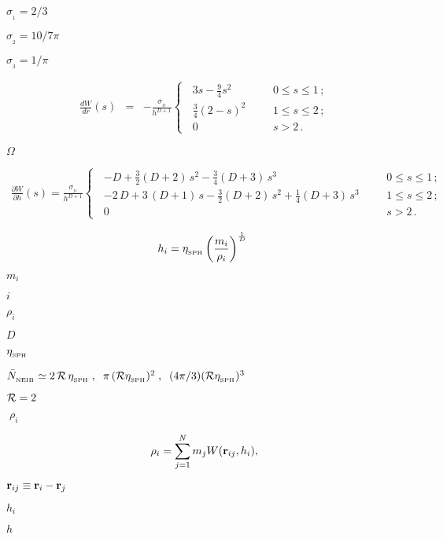 \documentclass{article}
\begin{document}
$\sigma_{_1}=2/3$
\pagebreak

$\sigma_{_2}=10/7\pi$
\pagebreak

$\sigma_{_3}=1/\pi$
\pagebreak

\begin{eqnarray} \frac{dW}{dr}(s) &=& - \frac{\sigma_{\!_D}}{h^{D+1}} \left\{ \;\; \begin{array}{ll} 3s - \frac{9}{4}s^2 \;\;\;\; & \;\;0 \leq s \leq 1\,; \\ \frac{3}{4}(2-s)^2 \;\;\;\; & \;\;1 \leq s \leq 2\,; \\ 0 \;\;\;\; & \;\;s > 2 \,. \end{array} \right . \end{eqnarray}
\pagebreak

$\Omega$
\pagebreak

\begin{eqnarray} \frac{\partial W}{\partial h}(s) = \frac{\sigma_{\!_D}}{h^{D+1}} \left\{ \;\; \begin{array}{ll} -D + \frac{3}{2}(D + 2)\,s^2 - \frac{3}{4}(D + 3)\,s^3 \;\;\;\; & \;\;0 \leq s \leq 1\,; \\ -2\,D + 3\,(D + 1)\,s - \frac{3}{2}(D + 2)\,s^2 + \frac{1}{4}(D + 3)\,s^3 \;\;\;\; & \;\;1 \leq s \leq 2\,; \\ 0 \;\;\;\; & \;\;s > 2 \,. \end{array} \right . \end{eqnarray}
\pagebreak

\[ h_i = \eta_{_{\rm SPH}} \left( \frac{m_i }{\rho_i} \right)^{\frac{1}{D}}\ \]
\pagebreak

$m_i$
\pagebreak

$i$
\pagebreak

$\rho_i$
\pagebreak

$D$
\pagebreak

$\eta_{_{\rm SPH}}$
\pagebreak

$\bar{N}_{_{\rm NEIB}} \simeq 2\,{\cal R}\,\eta_{_{\rm SPH}} \;,\;\; \pi\,({\cal R}\eta_{_{\rm SPH}})^2 \;,\;\;(4\pi /3)({\cal R}\eta_{_{\rm SPH}})^3\,\,$
\pagebreak

${\cal R}=2$
\pagebreak

$\;\rho_i$
\pagebreak

\[ \rho_i = \sum \limits_{j=1}^{N} m_j W({\bf r}_{ij},h_i), \]
\pagebreak

${\bf r}_{ij} \equiv {\bf r}_i - {\bf r}_j$
\pagebreak

$h_i$
\pagebreak

$h$
\pagebreak
\end{document}
